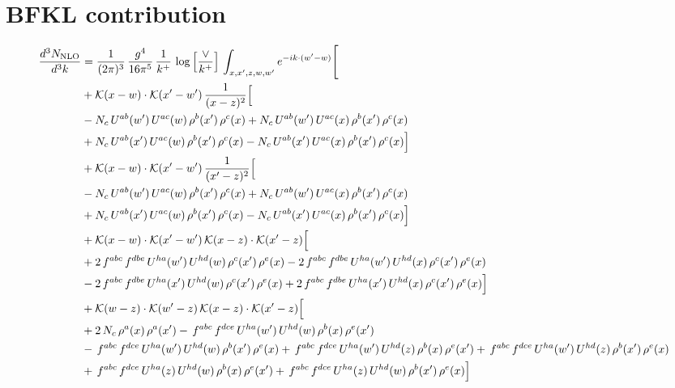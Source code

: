 \documentclass[9pt]{article}
\numberwithin{equation}{section}
\begin{document}
\section{BFKL contribution}
\begin{align}
\frac{d^{3}N_{\mathrm{NLO}}}{d^{3}k} & = \frac{1}{(2\pi)^{3}}\,\frac{g^{4}}{16\pi^{5}}\,\frac{1}{k^{+}}\,\log\Big[\frac{\vee}{k^{+}}\Big]\,\int_{x,x',z,w,w'}e^{-ik\cdot(w'-w)}\Bigg[ \notag\\
& +\mathcal{K}(x-w)\cdot\mathcal{K}(x'-w')\,\frac{1}{(x-z)^{2}}\Big[\notag\\
& -N_{c}\,U^{ab}(w')\,U^{ac}(w)\,\rho^{b}(x')\,\rho^{c}(x) +N_{c}\,U^{ab}(w')\,U^{ac}(x)\,\rho^{b}(x')\,\rho^{c}(x)\notag\\
& +N_{c}\,U^{ab}(x')\,U^{ac}(w)\,\rho^{b}(x')\,\rho^{c}(x) -N_{c}\,U^{ab}(x')\,U^{ac}(x)\,\rho^{b}(x')\,\rho^{c}(x)\Big]\notag\\
& +\mathcal{K}(x-w)\cdot\mathcal{K}(x'-w')\,\frac{1}{(x'-z)^{2}}\Big[\notag\\
& -N_{c}\,U^{ab}(w')\,U^{ac}(w)\,\rho^{b}(x')\,\rho^{c}(x) +N_{c}\,U^{ab}(w')\,U^{ac}(x)\,\rho^{b}(x')\,\rho^{c}(x)\notag\\
& +N_{c}\,U^{ab}(x')\,U^{ac}(w)\,\rho^{b}(x')\,\rho^{c}(x) -N_{c}\,U^{ab}(x')\,U^{ac}(x)\,\rho^{b}(x')\,\rho^{c}(x)\Big]\notag\\
& +\mathcal{K}(x-w)\cdot\mathcal{K}(x'-w')\,\mathcal{K}(x-z)\cdot\mathcal{K}(x'-z)\Big[\notag\\
& +2\,f^{abc}\,f^{dbe}\,U^{ha}(w')\,U^{hd}(w)\,\rho^{c}(x')\,\rho^{e}(x) -2\,f^{abc}\,f^{dbe}\,U^{ha}(w')\,U^{hd}(x)\,\rho^{c}(x')\,\rho^{e}(x)\notag\\
& -2\,f^{abc}\,f^{dbe}\,U^{ha}(x')\,U^{hd}(w)\,\rho^{c}(x')\,\rho^{e}(x) +2\,f^{abc}\,f^{dbe}\,U^{ha}(x')\,U^{hd}(x)\,\rho^{c}(x')\,\rho^{e}(x)\Big]\notag\\
& +\mathcal{K}(w-z)\cdot\mathcal{K}(w'-z)\,\mathcal{K}(x-z)\cdot\mathcal{K}(x'-z)\Big[\notag\\
& +2\,N_{c}\,\rho^{a}(x)\,\rho^{a}(x') -\,f^{abc}\,f^{dce}\,U^{ha}(w')\,U^{hd}(w)\,\rho^{b}(x)\,\rho^{e}(x')\notag\\
& -\,f^{abc}\,f^{dce}\,U^{ha}(w')\,U^{hd}(w)\,\rho^{b}(x')\,\rho^{e}(x) +\,f^{abc}\,f^{dce}\,U^{ha}(w')\,U^{hd}(z)\,\rho^{b}(x)\,\rho^{e}(x') +\,f^{abc}\,f^{dce}\,U^{ha}(w')\,U^{hd}(z)\,\rho^{b}(x')\,\rho^{e}(x)\notag\\
& +\,f^{abc}\,f^{dce}\,U^{ha}(z)\,U^{hd}(w)\,\rho^{b}(x)\,\rho^{e}(x') +\,f^{abc}\,f^{dce}\,U^{ha}(z)\,U^{hd}(w)\,\rho^{b}(x')\,\rho^{e}(x)\Big]\notag\\

\end{align}
\end{document}
